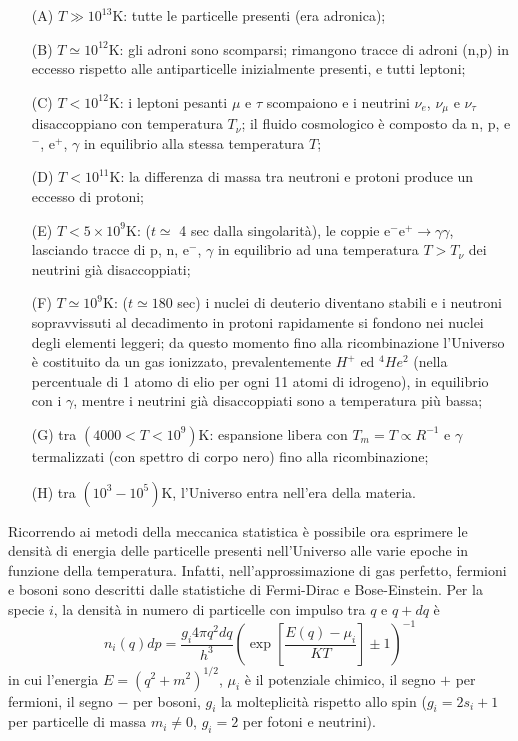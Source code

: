 \begin{itemize}
\item[(A)] $T \gg 10^{13}$K: tutte le particelle presenti (era adronica);
\item[(B)] $T \simeq 10^{12}$K: gli adroni sono scomparsi; rimangono tracce di
  adroni (n,p) in eccesso rispetto alle antiparticelle inizialmente presenti, e
  tutti leptoni;
\item[(C)] $T < 10^{12}$K: i leptoni pesanti $\mu$ e $\tau$ scompaiono e i
  neutrini $\nu_e$, $\nu_{\mu}$ e $\nu_{\tau}$ disaccoppiano con temperatura
  $T_{\nu}$; il fluido cosmologico è composto da n, p, e$^-$, e$^+$, $\gamma$ in
  equilibrio alla stessa temperatura $T$;
\item[(D)] $T < 10^{11}$K: la differenza di massa tra neutroni e protoni produce
  un eccesso di protoni;
\item[(E)] $T < 5 \times 10^{9}$K: ($t \simeq $ 4 sec dalla singolarità), le
  coppie $\text{e}^- \text{e}^+ \to \gamma \gamma$, lasciando tracce di p, n,
  e$^-$, $\gamma$ in equilibrio ad una temperatura $T > T_{\nu}$ dei neutrini
  già disaccoppiati;
\item[(F)] $T \simeq 10^{9}$K: ($t \simeq 180$ sec) i nuclei di deuterio
  diventano stabili e i neutroni sopravvissuti al decadimento in protoni
  rapidamente si fondono nei nuclei degli elementi leggeri; da questo momento
  fino alla ricombinazione l'Universo è costituito da un gas ionizzato,
  prevalentemente $H^+$ ed $^4He^2$ (nella percentuale di 1 atomo di elio per
  ogni 11 atomi di idrogeno), in equilibrio con i $\gamma$, mentre i neutrini
  già disaccoppiati sono a temperatura più bassa;
\item[(G)] tra $(4000 < T < 10^{9})$K: espansione libera con $T_m = T \propto
  R^{-1}$ e $\gamma$ termalizzati (con spettro di corpo nero) fino alla
  ricombinazione;
\item[(H)] tra $(10^3 -10^5)$K, l'Universo entra nell'era della materia.
\end{itemize}

Ricorrendo ai metodi della meccanica statistica è possibile ora esprimere le
densità di energia delle particelle presenti nell'Universo alle varie epoche in
funzione della temperatura.  Infatti, nell'approssimazione di gas perfetto,
fermioni e bosoni sono descritti dalle statistiche di Fermi-Dirac e
Bose-Einstein. Per la specie $i$, la densità in numero di particelle con impulso
tra $q$ e $q+dq$ è
\begin{equation}
  n_i(q) dp = \frac{g_i 4 \pi q^2 dq} {h^3} \left( \exp\left[{
      {\frac{E(q)-\mu_i}{KT}} }\right] \pm 1 \right)^{-1}
\end{equation}
in cui l'energia $E =(q^2+m^2)^{1/2}$, $\mu_i$ è il potenziale chimico, il segno
$+$ per fermioni, il segno $-$ per bosoni, $g_i$ la molteplicità rispetto allo
spin ($g_i=2 s_i+1$ per particelle di massa $m_i \ne 0$, $g_i=2$ per fotoni e
neutrini).

